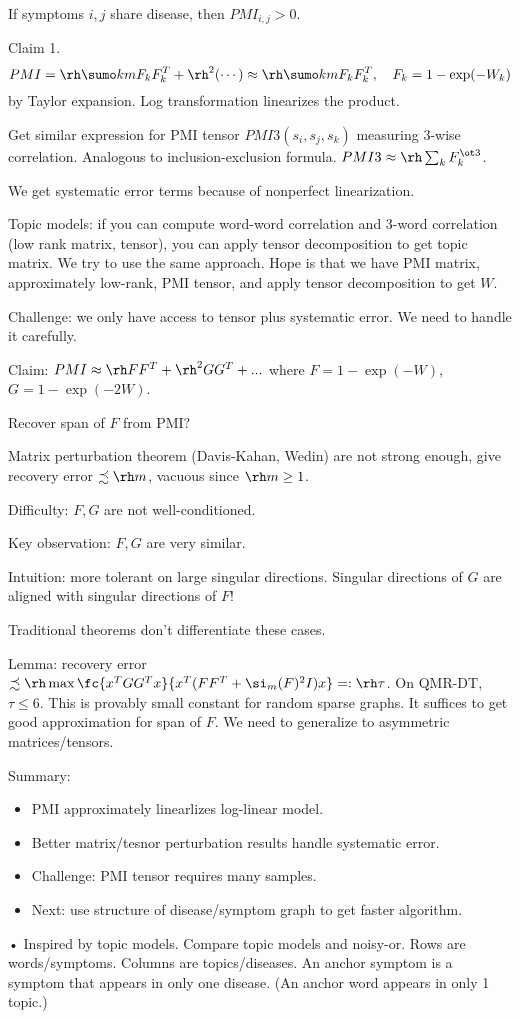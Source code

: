 If symptoms $i,j$ share disease, then $PMI_{i,j}>0$.

Claim 1.
$$
PMI = \rh\sumo km F_k F_k^T + \rh^2(\cdots) \approx \rh \sumo km F_k F_k^T, \quad F_k = 1-\exp(-W_k)
$$
by Taylor expansion.
Log transformation linearizes the product. 

Get similar expression for PMI tensor $PMI3(s_i,s_j,s_k)$ measuring 3-wise correlation. Analogous to inclusion-exclusion formula. $PMI3\approx \rh \sum_k F_k^{\ot 3}$. 

We get systematic error terms because of nonperfect linearization. 

Topic models: if you can compute word-word correlation and 3-word correlation (low rank matrix, tensor), you can apply tensor decomposition to get topic matrix. We try to use the same approach. Hope is that we have PMI matrix, approximately low-rank, PMI tensor, and apply tensor decomposition to get $W$. 

Challenge: we only have access to tensor plus systematic error. We need to handle it carefully.

Claim: $PMI\approx \rh FF^T + \rh^2 GG^T+...$ where $F=1-\exp(-W)$, $G=1-\exp(-2W)$. 

Recover span of $F$ from PMI?

Matrix perturbation theorem (Davis-Kahan, Wedin) are not strong enough, give recovery error $\precsim \rh m$, vacuous since $\rh m\ge 1$. 

Difficulty: $F, G$ are not well-conditioned. 

Key observation: $F, G$ are very similar. 

Intuition: more tolerant on large singular directions. Singular directions of $G$ are aligned with singular directions of $F$!

Traditional theorems don't differentiate these cases.

Lemma: recovery error $\precsim \rh \max\fc{x^TGG^Tx}{x^T(FF^T+\si_m(F)^2I)x}=:\rh\tau$.
On QMR-DT, $\tau\le 6$. This is provably small constant for random sparse graphs. It suffices to get good approximation for span of $F$. We need to generalize to asymmetric matrices/tensors.

Summary:
\begin{itemize}
\item
PMI approximately linearlizes log-linear model. 
\item
Better matrix/tesnor perturbation results handle systematic error.
\item
Challenge: PMI tensor requires many samples.
\item
Next: use structure of disease/symptom graph to get faster algorithm.
\end{itemize}•
Inspired by topic models. Compare topic models and noisy-or. Rows are words/symptoms. Columns are topics/diseases. An anchor symptom is a symptom that appears in only one disease. (An anchor word appears in only 1 topic.)

